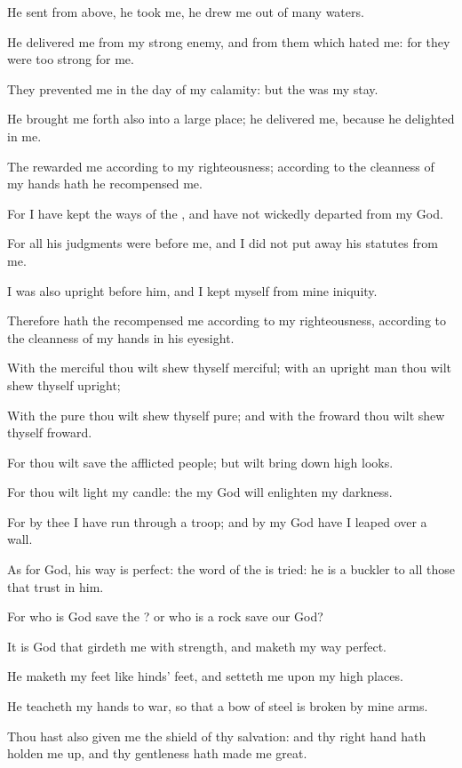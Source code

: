 \Verse He sent from above, he took me, he drew me out of many waters.

\Verse He delivered me from my strong enemy, and from them which hated me: for they were too strong for me.

\Verse They prevented me in the day of my calamity: but the \LORD was my stay.

\Verse He brought me forth also into a large place; he delivered me, because he delighted in me.

\Verse The \LORD rewarded me according to my righteousness; according to the cleanness of my hands hath he recompensed me.

\Verse For I have kept the ways of the \LORD, and have not wickedly departed from my God.

\Verse For all his judgments were before me, and I did not put away his statutes from me.

\Verse I was also upright before him, and I kept myself from mine iniquity.

\Verse Therefore hath the \LORD recompensed me according to my righteousness, according to the cleanness of my hands in his eyesight.

\Verse With the merciful thou wilt shew thyself merciful; with an upright man thou wilt shew thyself upright;

\Verse With the pure thou wilt shew thyself pure; and with the froward thou wilt shew thyself froward.

\Verse For thou wilt save the afflicted people; but wilt bring down high looks.

\Verse For thou wilt light my candle: the \LORD my God will enlighten my darkness.

\Verse For by thee I have run through a troop; and by my God have I leaped over a wall.

\Verse As for God, his way is perfect: the word of the \LORD is tried: he is a buckler to all those that trust in him.

\Verse For who is God save the \LORD? or who is a rock save our God?

\Verse It is God that girdeth me with strength, and maketh my way perfect.

\Verse He maketh my feet like hinds' feet, and setteth me upon my high places.

\Verse He teacheth my hands to war, so that a bow of steel is broken by mine arms.

\Verse Thou hast also given me the shield of thy salvation: and thy right hand hath holden me up, and thy gentleness hath made me great.

